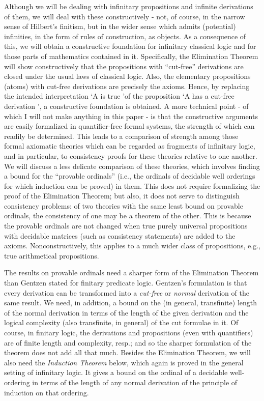 \documentclass{article}
\begin{document}
Although we will be dealing with infinitary propositions and infinite derivations of them, we will deal with these constructively - not, of course, in the narrow sense of Hilbert's finitism, but in the wider sense which admits (potential) infinities, in the form of rules of construction, as objects. As a consequence of this, we will obtain a constructive foundation for infinitary classical logic and for those parts of mathematics contained in it. Specifically, the Elimination Theorem will show constructively that the propositions with ``cut-free'' derivations are closed under the usual laws of classical logic. Also, the elementary propositions (atoms) with cut-free derivations are precisely the axioms. Hence, by replacing the intended interpretation \lq A is true \rq of the proposition \lq A has a cut-free derivation \rq, a constructive foundation is obtained. A more technical point - of which I will not make anything in this paper - is that the constructive arguments are easily formalized in quantifier-free formal systems, the strength of which can readily be determined. This leads to a comparison of strength among those formal axiomatic theories which can be regarded as fragments of infinitary logic, and in particular, to consistency proofs for these theories relative to one another. We will discuss a less delicate comparison of these theories, which involves finding a bound for the ``provable ordinals'' (i.e., the ordinals of decidable well orderings for which induction can be proved) in them. This does not require formalizing the proof of the Elimination Theorem; but also, it does not serve to distinguish consistency problems: of two theories with the same least bound on provable ordinals, the consistency of one may be a theorem of the other. This is because the provable ordinals are not changed when true purely universal propositions with decidable matrices (such as consistency statements) are added to the axioms. Nonconstructively, this applies to a much wider class of propositions, e.g., true arithmetical propositions.

The results on provable ordinals need a sharper form of the Elimination Theorem than Gentzen stated for finitary predicate logic. Gentzen's formulation is that every derivation can be transformed into a \emph{cut-free} or \emph{normal} derivation of the same result. We need, in addition, a bound on the (in general, transfinite) length of the normal derivation in terms of the length of the given derivation and the logical complexity (also transfinite, in general) of the cut formulae in it. Of course, in finitary logic, the derivations and propositions (even with quantifiers) are of finite length and complexity, resp.; and so the sharper formulation of the theorem does not add all that much. Besides the Elimination Theorem, we will also need the \emph{Induction Theorem} below, which again is proved in the general setting of infinitary logic. It gives a bound on the ordinal of a decidable well-ordering in terms of the length of any normal derivation of the principle of induction on that ordering.
\end{document}
